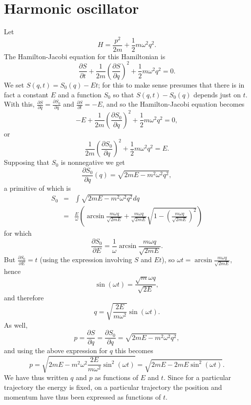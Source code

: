 \documentclass{article}
\theoremstyle{definition}
\begin{document}
\section{Harmonic oscillator}
Let
\[
H=\frac{p^2}{2m}+\frac{1}{2}m\omega^2 q^2.
\]
The Hamilton-Jacobi equation for this Hamiltonian is
\[
\frac{\partial S}{\partial t}+\frac{1}{2m} \left( \frac{\partial S}{\partial q} \right)^2 + \frac{1}{2}m\omega^2 q^2 =0.
\]
We set $S(q,t)=S_0(q)-Et$; for this to make sense presumes that there is in fact a constant $E$ and a function $S_0$ so that
 $S(q,t)-S_0(q)$ depends just on $t$. With this,
$\frac{\partial S}{\partial q} = \frac{\partial S_0}{\partial q}$
and $\frac{\partial S}{\partial t}=-E$,
and so the Hamilton-Jacobi equation becomes
\[
-E+ \frac{1}{2m}  \left( \frac{\partial S_0}{\partial q} \right)^2 + \frac{1}{2}m\omega^2 q^2 = 0 ,
\]
or
\[
\frac{1}{2m}  \left( \frac{\partial S_0}{\partial q} \right)^2 + \frac{1}{2}m\omega^2 q^2=E.
\]
Supposing that $S_0$ is nonnegative we get 
\[
\frac{\partial S_0}{\partial q}(q) = \sqrt{2mE-m^2 \omega^2 q^2},
\]
a primitive of which is
\begin{eqnarray*}
S_0 &=& \int \sqrt{2mE-m^2 \omega^2 q^2} dq\\
 &=&\frac{E}{\omega} \left( \arcsin \frac{m\omega q}{\sqrt{2mE}} + \frac{m\omega q}{\sqrt{2mE}} \sqrt{1-\left(\frac{m\omega q}{\sqrt{2mE}}\right)^2}\right)
 \end{eqnarray*}
for which
\[
\frac{\partial S_0}{\partial E} = \frac{1}{\omega} \arcsin \frac{m \omega q}{\sqrt{2mE}}.
\]
But $\frac{\partial S_0}{\partial E}=t$ (using the expression involving $S$ and $Et$), so $\omega t =  \arcsin \frac{m \omega q}{\sqrt{2mE}}$,
hence
\[
\sin(\omega t) = \frac{\sqrt{m}\omega q}{\sqrt{2E}},
\]
and therefore
\[
q=\sqrt{\frac{2E}{m\omega^2}} \sin(\omega t).
\] 
As well,
\[
p = \frac{\partial S}{\partial q} = \frac{\partial S_0}{\partial q} = \sqrt{2mE-m^2 \omega^2 q^2} ,
\]
and using the above expression for $q$ this becomes
\[
p= \sqrt{2mE - m^2 \omega^2 \frac{2E}{m\omega^2} \sin^2(\omega t)} = \sqrt{2mE - 2mE\sin^2(\omega t)}.
\]
We have thus written $q$ and $p$ as functions of $E$ and $t$. Since for a particular trajectory the energy is fixed, on a particular
trajectory the position and momentum have thus been expressed as functions of $t$. 
\end{document}
